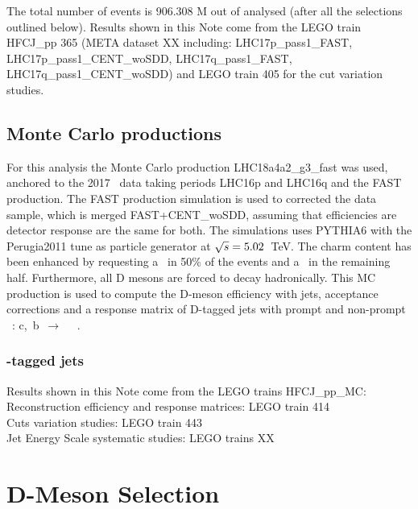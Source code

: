 The total number of events is 906.308  M  out of  analysed (after all the selections outlined below).
Results shown in this Note come from the LEGO train HFCJ\_pp 365 (META dataset {\color{red} XX} including: LHC17p\_pass1\_FAST, LHC17p\_pass1\_CENT\_woSDD, LHC17q\_pass1\_FAST, LHC17q\_pass1\_CENT\_woSDD) and LEGO train 405 for the cut variation studies.

\subsection{Monte Carlo productions}

For this analysis the Monte Carlo production LHC18a4a2\_g3\_fast was used, anchored to the 2017 \pp\ data taking periods LHC16p and LHC16q and the FAST production. The FAST production simulation is used to corrected the data sample, which is merged FAST+CENT\_woSDD, assuming that efficiencies are detector response are the same for both.
The simulations uses PYTHIA6 with the Perugia2011 tune as particle generator at $\sqrt{s}=5.02$~TeV.
The charm content has been enhanced by requesting a \ccbar\ in 50\% of the events and a \bbbar\ in the remaining half.
Furthermore, all D mesons are forced to decay hadronically.
This MC production is used to compute the D-meson efficiency with jets, acceptance corrections and a response matrix of D-tagged jets with prompt and non-prompt \Dzero\ : c,~b~$\rightarrow$ ~\Dzero\ .


\subsubsection{\Dzero-tagged jets}
Results shown in this Note come from the LEGO trains HFCJ\_pp\_MC:  
\\Reconstruction efficiency and response matrices: LEGO train {414}
\\Cuts variation studies: LEGO train {443}
\\Jet Energy Scale systematic studies: LEGO trains {\color{red} XX}



\section{D-Meson Selection}
\label{sec:DmesonSel}

